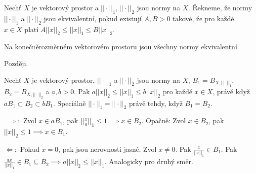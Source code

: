 \documentclass[12pt]{article}					%
\begin{document}
\begin{definice}
	Nechť $X$ je vektorový prostor a $||·||_1$, $||·||_2$ jsou normy na $X$. Řekneme, že normy $||·||_1$ a $||·||_2$ jsou ekvivalentní, pokud existují $A, B > 0$ takové, že pro každé $x \in X$ platí $A ||x||_2 ≤ ||x||_1 ≤ B||x||_2$.
\end{definice}

\begin{veta}
	Na konečněrozměrném vektorovém prostoru jsou všechny normy ekvivalentní.

	\begin{dukazin}
		Později.
	\end{dukazin}
\end{veta}

\begin{lemma}
	Nechť $X$ je vektorový prostor, $||·||_1$ a $||·||_2$ jsou normy na $X$, $B_1 = B_{X, ||·||_1}$, $B_2 = B_{X, ||·||_2}$ a $a, b > 0$. Pak $a||x||_2 ≤ ||x||_1 ≤ b||x||_2$ pro každé $x \in X$, právě když $a B_1 \subset B_2 \subset b B_1$. Speciálně $||·||_1 = ||·||_2$ právě tehdy, když $B_1 = B_2$.

	\begin{dukazin}
		$\implies:$ Zvol $x \in a B_1$, pak $||\frac{x}{a}||_1 ≤ 1 \implies x \in B_2$. Opačně: Zvol $x \in B_2$, pak $||x||_2 ≤ 1 \implies x \in B_1$.

		$\Leftarrow:$ Pokud $x = 0$, pak jsou nerovnosti jasné. Zvol $x≠0$. Pak $\frac{x}{||x||_1} \in B_1$. Pak $\frac{ax}{||x||_1} \in B_1 \subseteq B_2 \implies a||x||_2 ≤ ||x||_1$. Analogicky pro druhý směr.  
	\end{dukazin}
\end{lemma}
\end{document}

